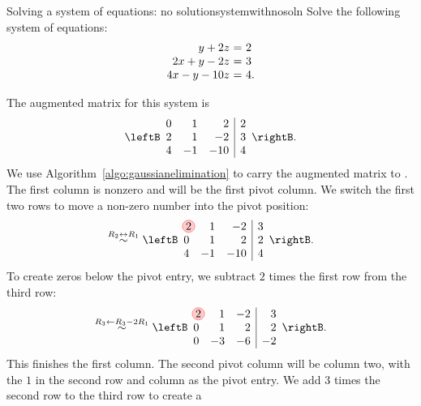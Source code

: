 \begin{example}{Solving a system of equations: no solution}{systemwithnosoln}
  Solve the following system of equations:
  \begin{equation*}
    \begin{array}{r@{~}c@{~}l}
           y  +2z &=& 2\\
      2x  +y  -2z &=& 3\\
      4x  -y -10z &=& 4.
    \end{array}
  \end{equation*}
\end{example}

\begin{solution} The augmented matrix for this system is
  \begin{equation*}
    \leftB
    \begin{array}{rrr|r}
      0 &  1 &   2 & 2\\
      2 &  1 &  -2 & 3\\
      4 & -1 & -10 & 4      
    \end{array}
    \rightB.
  \end{equation*}
  We use Algorithm~\ref{algo:gaussianelimination} to carry the
  augmented matrix to {\ef}. The first column is nonzero and will be the
  first pivot column. We switch the first two rows to move a non-zero
  number into the pivot position:
  \begin{equation*}
  \stackrel{R_2\leftrightarrow R_1}{\sim}
    \leftB
    \begin{array}{rrr|r}
      \circled{2} &  1 &  -2 & 3\\
      0 &  1 &   2 & 2\\
      4 & -1 & -10 & 4      
    \end{array}
    \rightB.
  \end{equation*}
  To create zeros below the pivot entry, we subtract $2$ times the
  first row from the third row:
  \begin{equation*}
  \stackrel{R_3\leftarrow R_3-2R_1}{\sim}
    \leftB
    \begin{array}{rrr|r}
      \circled{2} &  1 &  -2 & 3\\
      0 &  1 &   2 & 2\\
      0 & -3 & -6 & -2      
    \end{array}
    \rightB.
  \end{equation*}
  This finishes the first column. The second pivot column will be
  column two, with the $1$ in the second row and column as the pivot
  entry. We add $3$ times the second row to the third row to create a

\end{solution}

